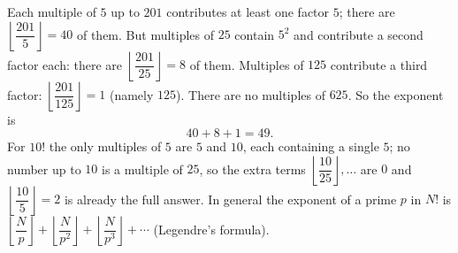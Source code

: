 Each multiple of $5$ up to $201$ contributes at least one factor $5$; there are $\left\lfloor\dfrac{201}{5}\right\rfloor=40$ of them. But multiples of $25$ contain $5^2$ and contribute a second factor each: there are $\left\lfloor\dfrac{201}{25}\right\rfloor=8$ of them. Multiples of $125$ contribute a third factor: $\left\lfloor\dfrac{201}{125}\right\rfloor=1$ (namely $125$). There are no multiples of $625$. So the exponent is
\[
40+8+1=\boxed{49}.
\]
For $10!$ the only multiples of $5$ are $5$ and $10$, each containing a single $5$; no number up to $10$ is a multiple of $25$, so the extra terms $\left\lfloor\dfrac{10}{25}\right\rfloor,\dots$ are $0$ and $\left\lfloor\dfrac{10}{5}\right\rfloor=2$ is already the full answer. In general the exponent of a prime $p$ in $N!$ is $\left\lfloor\dfrac {N}{p}\right\rfloor+\left\lfloor\dfrac {N}{p^2}\right\rfloor+\left\lfloor\dfrac {N}{p^3}\right\rfloor+\cdots$ (Legendre's formula).
